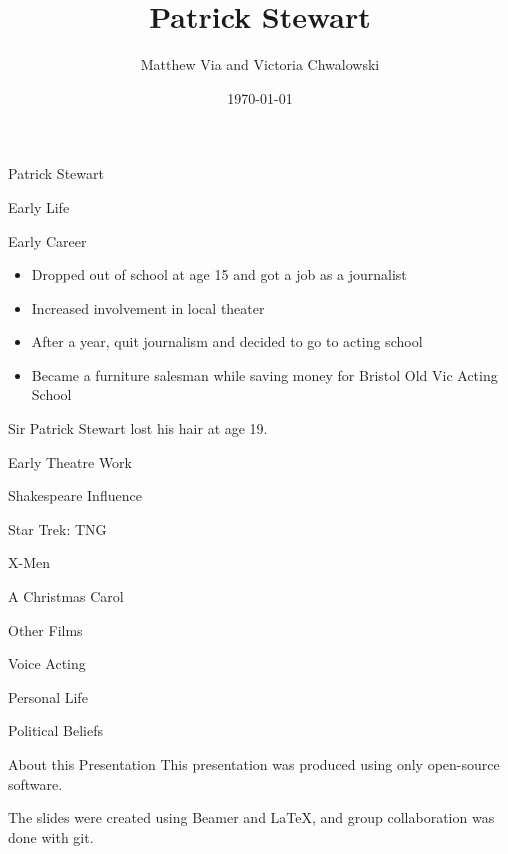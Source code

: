 \documentclass[xcolor=dvipsnames]{beamer}
\begin{document}
\author{Matthew Via and Victoria Chwalowski}
\title{Patrick Stewart}
\date{\today}
\begin{frame}{Patrick Stewart}

\end{frame}
\begin{frame}{Early Life}

\end{frame}
\begin{frame}{Early Career}
  \begin{itemize}
    \item Dropped out of school at age 15 and got a job as a journalist
    \item Increased involvement in local theater
    \item After a year, quit journalism and decided to go to acting school
    \item Became a furniture salesman while saving money for Bristol Old Vic
    Acting School
  \end{itemize}
  \begin{fct}
    Sir Patrick Stewart lost his hair at age 19.
  \end{fct}
\end{frame}
\begin{frame}{Early Theatre Work}

\end{frame}
\begin{frame}{Shakespeare Influence}

\end{frame}
\begin{frame}{Star Trek: TNG}

\end{frame}
\begin{frame}{X-Men}

\end{frame}
\begin{frame}{A Christmas Carol}

\end{frame}
\begin{frame}{Other Films}

\end{frame}
\begin{frame}{Voice Acting}

\end{frame}
\begin{frame}{Personal Life}

\end{frame}
\begin{frame}{Political Beliefs}

\end{frame}
\begin{frame}{About this Presentation}
This presentation was produced using only open-source software.

The slides were created using Beamer and LaTeX, and group collaboration was done
with git.
\end{frame}
\end{document}

